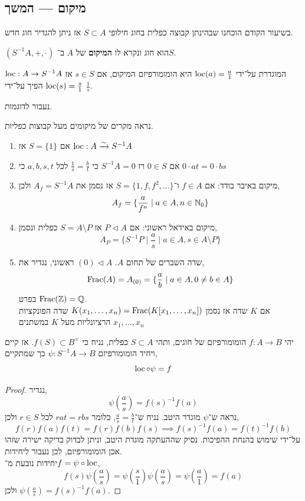 \subsection{מיקום --- המשך}
בשיעור הקודם הוכחנו שבהינתן קבוצה כפלית בחוג חילופי $S \subset A$ אז ניתן להגדיר חוג חדש.
\begin{definition}
	$(S^{-1} A, +, \cdot)$ הוא חוג ונקרא לו \textbf{המיקום} של $A$ ב־$S$.
\end{definition}
\begin{definition}
	$\operatorname{loc} : A \to S^{-1} A$ המוגדרת על־ידי $\operatorname{loc}(a) = \frac{a}{1}$ היא הומומורפיזם המיקום, אם $s \in S$ אז $\operatorname{loc}(s) = \frac{s}{1}$ הפיך על־ידי $\frac{1}{s}$.
\end{definition}
נעבור לדוגמות.
\begin{example}
	נראה מקרים של מיקומים מעל קבוצות כפליות.
	\begin{enumerate}
		\item אם $S = \{ 1 \}$ אז $\operatorname{loc} : A \xrightarrow{\sim} S^{-1} A$
		\item אם $0 \in S$ רז $S^{-1} A = 0$ כי $\frac{1}{s} = \frac{b}{t}$ לכל $a, b, s, t$ כי $0 \cdot a t = 0 \cdot b s$
		\item מיקום באיבר בודד: אם $f \in A$ ו־$S = \{1, f, f^2, \ldots\}$ אז נסמן את $A_f = S^{-1} A$ ולכן,
			\[
				A_f
				= \{ \frac{a}{f^n} \mid a \in A, n \in \mathbb{N}_0 \}
			\]
		\item מיקום באידאל ראשוני:
			אם $P \triangleleft A$ אז $S = A \setminus P$ כפלית ונסמן,
			\[
				A_P
				= \{ S^{-1} P \mid \frac{a}{s} \mid a \in A, s \in A \setminus P \}
			\]
		\item שדה השברים של תחום $A$.
			$(0) \triangleleft A$ ראשוני, נגדיר את,
			\[
				\operatorname{Frac}(A)
				= A_{(0)}
				= \{ \frac{a}{b} \mid a \in A, 0 \ne b \in A \}
			\]
			בפרט $\operatorname{Frac}(\mathbb{Z}) = \mathbb{Q}$. \\
			אם $K$ שדה אז נסמן $K(x_1, \ldots, x_n) = \operatorname{Frac}(K[x_1, \ldots, x_n])$ שדה הפונקציות הרציונליות מעל $K$ במשתנים $x_1, \ldots, x_n$
	\end{enumerate}
\end{example}
\begin{theorem}
	יהי $f : A \to B$ הומומורפיזם של חוגים, ותהי $S \subset A$ כפלית, נניח כי $f(S) \subset B^\times$.
	אז קיים ויחיד הומומורפיזם $\psi : S^{-1} A \to B$ כך שמתקיים,
	\[
		\operatorname{loc} \circ \psi
		= f
	\]
\end{theorem}
\begin{proof}
	נגדיר,
	\[
		\psi(\frac{a}{s})
		= f{(s)}^{-1} f(a)
	\]
	נראה ש־$\psi$ מוגדר היטב.
	נניח ש־$\frac{a}{s} = \frac{b}{t}$, כלומר $r a t = r b s$ לכל $r \in S$ ולכן,
	\[
		f(r) f(a) f(t)
		= f(r) f(b) f(s)
		\implies f{(s)}^{-1} f(a)
		= f{(t)}^{-1} f(b)
	\]
	על־ידי שימוש בהנחת ההפיכות.
	נסיק שההעתקה מוגדת היטב, וניתן לבדוק בדיקה ישירה שזהו אכן הומומורפיזם, לכן נעבור ליחידות. \\
	יחידות נובעת מ־$f = \psi \circ \operatorname{loc}$,
	\[
		f(s) \psi(\frac{a}{s})
		= \psi(\frac{s}{1}) \psi(\frac{a}{s})
		= \psi(\frac{a}{1})
		= f(a)
	\]
	ולכן $\psi(\frac{a}{s}) = f{(s)}^{-1} f(a)$.
\end{proof}
